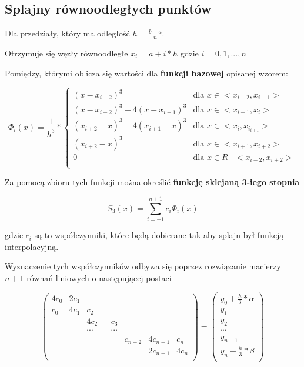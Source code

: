 \documentclass[varwidth,12pt,a4paper]{article}
\begin{document}


\subsection{Splajny równoodległych punktów}

Dla przedziały, który ma odległość $h = \frac{b - a}{n}$.

Otrzymuje się węzły równoodległe $x_i = a + i * h$ gdzie $i = 0,1,...,n$

Pomiędzy, którymi oblicza się wartości dla \textbf{funkcji bazowej}
opisanej wzorem:

\begin{equation}
  \Phi_{i} (x) = \frac{1}{h^3} *
    \begin{cases}
      (x - x_{i-2})^3 & \text{dla $x \in <x_{i-2}, x_{i-1}> $}\\
      (x - x_{i-2})^3 - 4(x-x_{i-1})^3 & \text{dla $x \in <x_{i-1}, x_{i}> $}\\
      (x_{i+2} - x)^3 - 4(x_{i+1} - x)^3 & \text{dla $x \in <x_{i}, x_{i_{i+1}}> $}\\
      (x_{i+2} - x)^3 & \text{dla $x \in <x_{i+1}, x_{i+2}> $}\\
      0 & \text{dla $x \in R - <x_{i-2}, x_{i+2}> $}\\
    \end{cases}       
\end{equation}

Za pomocą zbioru tych funkcji można określić \textbf{funkcję sklejaną 3-iego stopnia}

\begin{equation}
    S_3(x) = \sum_{i=-1}^{n+1} c_i \Phi_i (x)
\end{equation}

gdzie $c_i$ są to współczynniki, które będą dobierane tak aby splajn był
funkcją interpolacyjną.

Wyznaczenie tych współczynników odbywa się poprzez rozwiązanie macierzy $n + 1$
równań liniowych  o następującej postaci


$$
\left( \begin{array}{cccccccc}
    4c_0 & 2c_1 \\
    c_0 & 4c_1 & c_2 \\
     &  & 4c_2 && c_3 \\
     &  & \cdots && \cdots \\
     &  &  & & & c_{n-2} & 4c_{n-1} & c_n \\
     &  &  & & & & 2c_{n-1} & 4c_n \\
\end{array} \right) = \left( \begin{array}{c}
    y_0 + \frac{h}{3} * \alpha \\
    y_1 \\
    y_2 \\
    \cdots \\
    y_{n-1} \\
    y_n - \frac{h}{3} * \beta \\
\end{array} \right) 
$$
\end{document}
